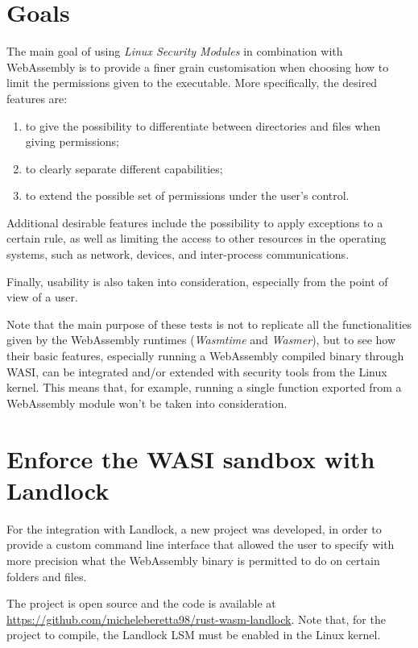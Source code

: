 \section{Goals}

The main goal of using \textit{Linux Security Modules} in combination with WebAssembly
is to provide a finer grain customisation when choosing how to limit the permissions given
to the executable. More specifically, the desired features are:
\begin{enumerate}
  \item to give the possibility to differentiate between directories and files when giving permissions;
  \item to clearly separate different capabilities;
  \item to extend the possible set of permissions under the user's control.
\end{enumerate}

Additional desirable features include the possibility to apply exceptions to a certain rule, as well
as limiting the access to other resources in the operating systems, such as network, devices, and
inter-process communications.

Finally, usability is also taken into consideration, especially from the point of view of a user.

Note that the main purpose of these tests is not to replicate all the functionalities given by
the WebAssembly runtimes (\textit{Wasmtime} and \textit{Wasmer}), but to see how their basic features,
especially running a WebAssembly compiled binary through WASI, can be integrated and/or extended with
security tools from the Linux kernel.
This means that, for example, running a single function exported from a WebAssembly module won't be taken
into consideration.

\newpage
\section{Enforce the WASI sandbox with Landlock}

For the integration with Landlock, a new project was developed, in order to provide
a custom command line interface that allowed the user to specify with more precision what
the WebAssembly binary is permitted to do on certain folders and files.

The project is open source and the code is available at \url{https://github.com/micheleberetta98/rust-wasm-landlock}.
Note that, for the project to compile, the Landlock LSM must be enabled in the Linux kernel.

